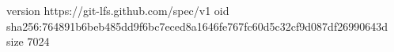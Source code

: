 version https://git-lfs.github.com/spec/v1
oid sha256:764891b6beb485dd9f6bc7eced8a1646fe767fc60d5c32cf9d087df26990643d
size 7024
